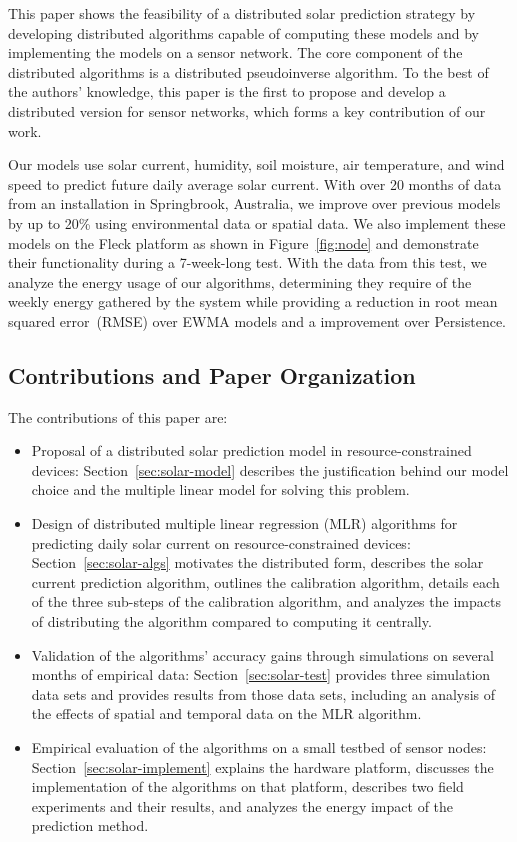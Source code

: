 \documentclass[prodmode,acmtosn]{acmsmall}
\begin{document}
This paper shows the feasibility of a distributed solar prediction strategy by developing distributed algorithms capable of computing these models and by implementing the models on a sensor network.
The core component of the distributed algorithms is a distributed pseudoinverse algorithm. To the best of the authors' knowledge, this paper is the first to propose and develop a distributed version for sensor networks, which forms a key contribution of our work.

Our models use solar current, humidity, soil moisture, air temperature, and wind speed to predict future daily average solar current.
With over 20 months of data from an installation in Springbrook, Australia, we improve over  previous models by up to 20\% using environmental data  or spatial data.
We also implement these models on the Fleck platform as shown in Figure~\ref{fig:node} and demonstrate their functionality during a 7-week-long test.
With the data from this test, we analyze the energy usage of our algorithms, determining they require  of the weekly energy gathered by the system while providing a   reduction in root mean squared error~(RMSE) over EWMA models and a  improvement over Persistence.

\subsection{Contributions and Paper Organization}
The contributions of this paper are:
\begin{itemize}
\item Proposal of a distributed solar prediction model in resource-constrained devices: Section~\ref{sec:solar-model} describes the justification behind our model choice and the multiple linear model for solving this problem.
\item Design of distributed multiple linear regression (MLR) algorithms for predicting daily solar current on resource-constrained devices: Section~\ref{sec:solar-algs} motivates the distributed form, describes the solar current prediction algorithm, outlines the calibration algorithm, details each of the three sub-steps of the calibration algorithm, and analyzes the impacts of distributing the algorithm compared to computing it centrally.
\item Validation of the algorithms' accuracy gains through simulations on several months of empirical data: Section~\ref{sec:solar-test} provides three simulation data sets and provides results from those data sets, including an analysis of the effects of spatial and temporal data on the MLR algorithm.
\item Empirical evaluation of the algorithms on a small testbed of sensor nodes: Section~\ref{sec:solar-implement} explains the hardware platform, discusses the implementation of the algorithms on that platform, describes two field experiments and their results, and analyzes the energy impact of the prediction method.
\end{itemize}
\end{document}
